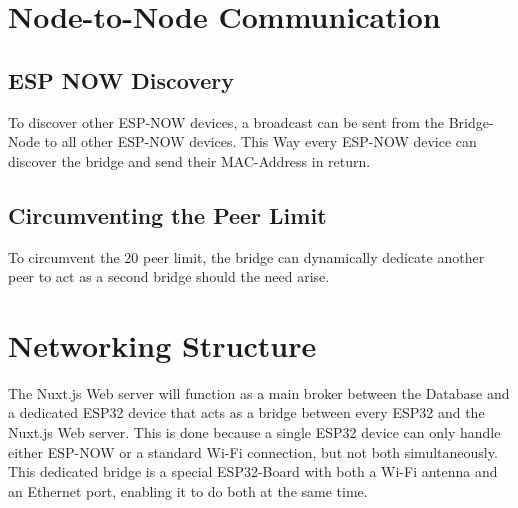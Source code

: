 \section{Node-to-Node Communication}
    \subsection{ESP NOW Discovery}
    To discover other ESP-NOW devices, a broadcast can be sent
    from the Bridge-Node to all other ESP-NOW devices. This
    Way every ESP-NOW device can discover the bridge and send
    their MAC-Address in return.

    \subsection{Circumventing the Peer Limit}
    To circumvent the 20 peer limit, the bridge can dynamically
    dedicate another peer to act as a second bridge should the
    need arise. 


\section{Networking Structure}
The Nuxt.js Web server will function as a main broker between
the Database and a dedicated ESP32 device that  acts
as a bridge between every ESP32 and the Nuxt.js Web server.
This is done because a single ESP32 device can only handle
either ESP-NOW or a standard Wi-Fi connection, but not both
simultaneously. This dedicated bridge is a special 
ESP32-Board with both a Wi-Fi antenna and an Ethernet port,
enabling it to do both at the same time. 

    